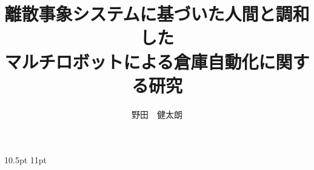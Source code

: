 \documentclass[a4paper,twocolumn,twoside,disablejfam,acnrathesis]{thesisresume}
\title{離散事象システムに基づいた人間と調和した\\マルチロボットによる倉庫自動化に関する研究}
\author{野田　健太朗}
\begin{document}
\thesisresume
{
	\fontsize
	{10.5pt}	%
	{11pt}		%
	\selectfont
	
}

{\footnotesize}
\end{document}

